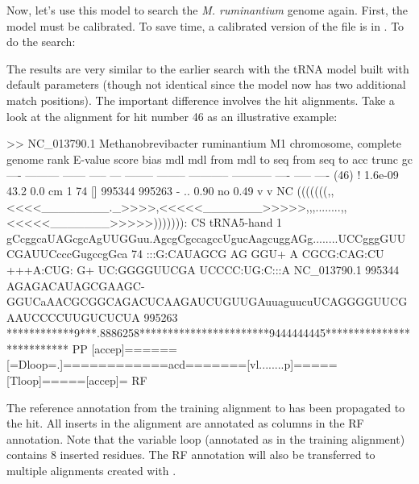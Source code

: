 Now, let's use this model to search the \emph{M. ruminantium} genome
again. First, the model must be calibrated. To save time, a calibrated
version of the file is in . To do the
search:


The results are very similar to the earlier search with the
tRNA model built with default  parameters (though not
identical since the model now has two additional match positions). The
important difference involves the hit alignments. Take a look at the
alignment for hit number 46 as an illustrative example:

\begin{sreoutput}
>> NC_013790.1  Methanobrevibacter ruminantium M1 chromosome, complete genome
 rank     E-value  score  bias mdl mdl from   mdl to       seq from      seq to       acc trunc   gc
 ----   --------- ------ ----- --- -------- --------    ----------- -----------      ---- ----- ----
 (46) !   1.6e-09   43.2   0.0  cm        1       74 []      995344      995263 - .. 0.90    no 0.49
                                 v          v                                                            NC
                     (((((((,,<<<<________._>>>>,<<<<<_______>>>>>,,,........,,<<<<<_______>>>>>))))))): CS
   tRNA5-hand      1 gCcggcaUAGcgcAgUUGGuu.AgcgCgccagccUgucAagcuggAGg........UCCgggGUUCGAUUCcccGugccgGca 74    
                     :::G:CAUAGCG AG  GGU+ A CGCG:CAG:CU +++A:CUG: G+        UC:GGGGUUCGA UCCCC:UG:C:::A
  NC_013790.1 995344 AGAGACAUAGCGAAGC-GGUCaAACGCGGCAGACUCAAGAUCUGUUGAuuaguucuUCAGGGGUUCGAAUCCCCUUGUCUCUA 995263
                     ************9***.8886258***********************9444444445************************** PP
                     [accep]======[=Dloop=.]============acd=======[vl........p]=====[Tloop]=====[accep]= RF
\end{sreoutput}

The reference annotation from the training alignment to 
has been propagated to the hit. All inserts in the alignment are
annotated as  columns in the RF annotation. Note that the
variable loop (annotated as \otext{[vlp]} in the training alignment)
contains 8 inserted residues. The RF annotation will also be
transferred to multiple alignments created with .

